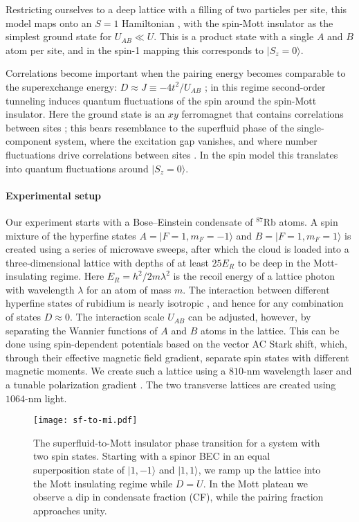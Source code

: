 \documentclass[aps,prl,twocolumn]{revtex4-1}
\begin{document}
Restricting ourselves to a deep lattice with a filling of two particles per site, this model maps onto an $S = 1$ Hamiltonian \cite{Altman03, Schachenmayer15}, with the spin-Mott insulator as the simplest ground state for $U_{AB} \ll U$. This is a product state with a single $A$ and $B$ atom per site, and in the spin-1 mapping this corresponds to $|S_z = 0\rangle$.

Correlations become important when 
the pairing energy becomes comparable to the superexchange energy: $D \approx J \equiv -4t^2/U_{AB}$ \cite{Chung21,Kuklov03,Duan03}; in this regime second-order tunneling induces quantum fluctuations of the spin around the spin-Mott insulator. Here the ground state is an $xy$ ferromagnet that contains correlations between sites \cite{Schachenmayer15}; this bears resemblance to the superfluid phase of the single-component system, where the excitation gap vanishes, and where number fluctuations drive correlations between sites \cite{Freericks94}. In the spin model this translates into quantum fluctuations around $|S_z=0\rangle$.

\paragraph*{Experimental setup}
Our experiment starts with a Bose--Einstein condensate of $^{87}$Rb atoms.  A spin mixture of the hyperfine states $A = |F=1, m_F=-1\rangle$ and $B = |F=1, m_F=1\rangle$ is created using a series of microwave sweeps, after which the cloud is loaded into a three-dimensional lattice with depths of at least $25E_R$ to be deep in the Mott-insulating regime. Here $E_R = h^2/2m\lambda^2$ is the recoil energy of a lattice photon with wavelength $\lambda$ for an atom of mass $m$. The interaction between different hyperfine states of rubidium is nearly isotropic \cite{Stamper-Kurn13, Widera06}, and hence for any combination of states $D \approx 0$. The interaction scale $U_{AB}$ can be adjusted, however, by separating the Wannier functions of $A$ and $B$ atoms in the lattice. This can be done using spin-dependent potentials based on the vector AC Stark shift, which, through their effective magnetic field gradient, separate spin states with different magnetic moments. We create such a lattice using a $810$-nm wavelength laser and a tunable polarization gradient \cite{Supplemental}. The two transverse lattices are created using $1064$-nm light.

\begin{figure}
    \centering
    \texttt{[image: sf-to-mi.pdf]}
    \caption{The superfluid-to-Mott insulator phase transition for a system with two spin states.  Starting with a spinor BEC in an equal superposition state of $|1,-1\rangle$ and $|1,1\rangle$, we ramp up the lattice into the Mott insulating regime while $D = U$. In the Mott plateau we observe a dip in condensate fraction (CF), while the pairing fraction approaches unity.}
    \label{fig:sf-to-mi-overview}
\end{figure}
\end{document}
